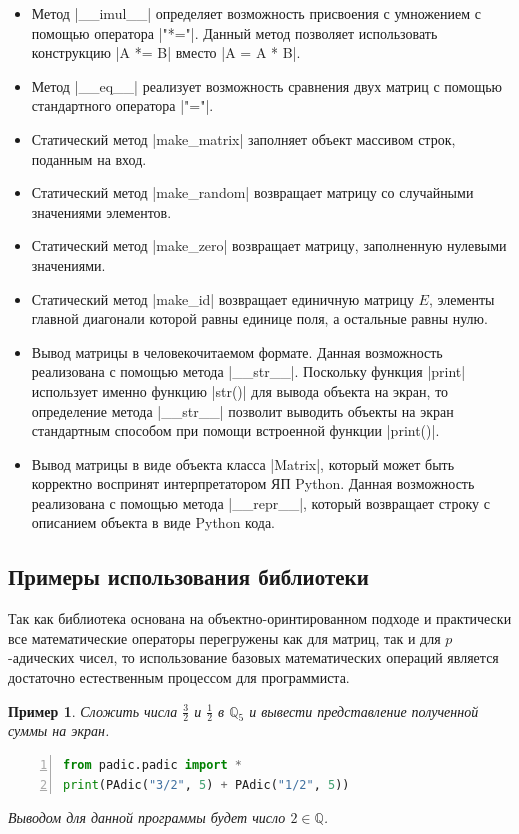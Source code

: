 \documentclass[master, och, diploma, times]{sty/SCWorks}
\theoremstyle{plain}
\newtheorem{exmp}{Пример}[section]
\theoremstyle{definition}
\numberwithin{equation}{section}
\begin{document}
\begin{itemize}
\item Метод |__imul__| определяет возможность присвоения с умножением с помощью оператора |"*="|. Данный метод позволяет использовать конструкцию |A *= B| вместо |A = A * B|.
\item Метод |__eq__| реализует возможность сравнения двух матриц с помощью стандартного оператора |"="|.
\item Статический метод |make_matrix| заполняет объект массивом строк, поданным на вход.
\item Статический метод |make_random| возвращает матрицу со случайными значениями элементов.
\item Статический метод |make_zero| возвращает матрицу, заполненную нулевыми значениями.
\item Статический метод |make_id| возвращает единичную матрицу $E$, элементы главной диагонали которой равны единице поля, а остальные равны нулю.
\item Вывод матрицы в человекочитаемом формате. Данная возможность реализована с помощью метода |__str__|. Поскольку функция |print| использует именно функцию |str()| для вывода объекта на экран, то определение метода |__str__| позволит выводить объекты на экран стандартным способом при помощи встроенной функции |print()|.
\item Вывод матрицы в виде объекта класса |Matrix|, который может быть корректно воспринят интерпретатором ЯП Python. Данная возможность реализована с помощью метода |__repr__|, который возвращает строку с описанием объекта в виде Python кода.
\end{itemize}


\subsection{Примеры использования библиотеки}

Так как библиотека основана на объектно-оринтированном подходе и практически все математические операторы перегружены как для матриц, так и для $p$-адических чисел, то использование базовых математических операций является достаточно естественным процессом для программиста.

\begin{exmp}
Сложить числа $\frac{3}{2}$ и $\frac{1}{2}$ в $\mathbb{Q}_5$ и вывести представление полученной суммы на экран.
\begin{lstlisting}[language=Python, numbers=left, showstringspaces=false, breaklines=true, basicstyle=\small]
from padic.padic import *
print(PAdic("3/2", 5) + PAdic("1/2", 5))
\end{lstlisting}

\noindent Выводом для данной программы будет число $2 \in \mathbb{Q}$.
\end{exmp}
\end{document}
